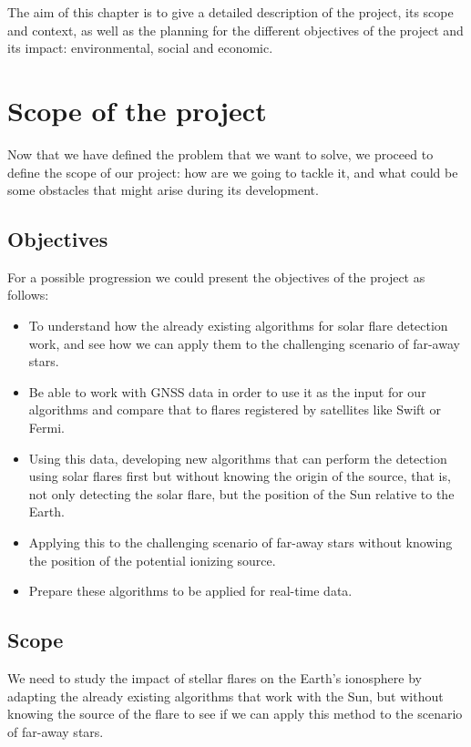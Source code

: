 The aim of this chapter is to give a detailed description of the project, its scope and context, as well as the planning for the different objectives of the project and its impact: environmental, social and economic.


\section{Scope of the project}

Now that we have defined the problem that we want to solve, we proceed to define the scope of our project: how are we going to tackle it, and what could be some obstacles that might arise during its development.

\subsection{Objectives}

For a possible progression we could present the objectives of the project as follows:

\begin{itemize}
  \item To understand how the already existing algorithms for solar flare detection work, and see how we can apply them to the challenging scenario of far-away stars.
  \item Be able to work with GNSS data in order to use it as the input for our algorithms and compare that to flares registered by satellites like Swift or Fermi.
  \item Using this data, developing new algorithms that can perform the detection using solar flares first but without knowing the origin of the source, that is, not only detecting the solar flare, but the position of the Sun relative to the Earth.
  \item Applying this to the challenging scenario of far-away stars without knowing the position of the potential ionizing source.
  \item Prepare these algorithms to be applied for real-time data.
\end{itemize}

\subsection{Scope}

We need to study the impact of stellar flares on the Earth’s ionosphere by adapting the already existing algorithms that work with the Sun, but without knowing the source of the flare to see if we can apply this method to the scenario of far-away stars.

